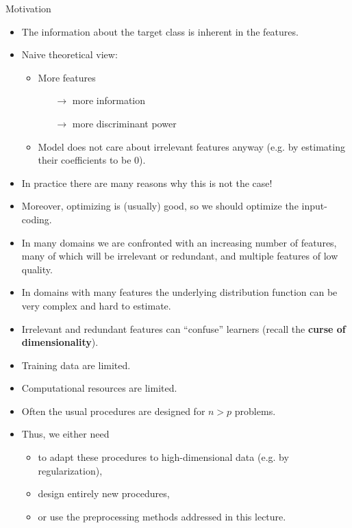 \documentclass[11pt,compress,t,notes=noshow, xcolor=table]{beamer}
\begin{document}
  \begin{vbframe}{Motivation}
    \begin{itemize}
      \item The information about the target class is inherent in the features.
      \item Naive theoretical view:
        \begin{itemize}
          \item More features
          \begin{itemize}
            \item[$\rightarrow$] more information
            \item[$\rightarrow$] more discriminant power
          \end{itemize}
          \item Model does not care about irrelevant features anyway (e.g. by estimating their coefficients to be 0).
        \end{itemize}
      \item In practice there are many reasons why this is not the case!
      \item Moreover, optimizing is (usually) good, so we should optimize the input-coding.
  \end{itemize}

  \framebreak

    \begin{itemize}
      \item In many domains we are confronted with an increasing number of features, many of which will be irrelevant or redundant, and multiple features of low quality.
      \item In domains with many features the underlying distribution function can be very complex and hard to estimate.
      \item Irrelevant and redundant features can \enquote{confuse} learners (recall the \textbf{curse of dimensionality}).
      \item Training data are limited.
      \item Computational resources are limited.
      \item Often the usual procedures are designed for $n > p$ problems.
      \item Thus, we either need
      \begin{itemize}
        \item to adapt these procedures to high-dimensional data (e.g. by regularization),
        \item design entirely new procedures,
        \item or use the preprocessing methods addressed in this lecture.
      \end{itemize}
    \end{itemize}
  \end{vbframe}
\end{document}
